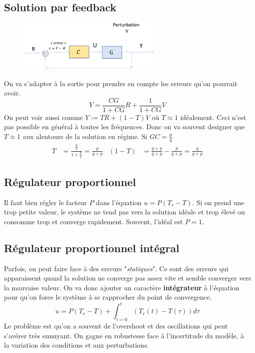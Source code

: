 \documentclass{report}
\begin{document}
\subsection{Solution par feedback}
\begin{figure}[H]
\centering
\includegraphics[width=7cm]{img/feedbeck.png}
\end{figure}
On va s'adapter à la sortie pour prendre en compte les erreurs qu'on pourrait avoir.
\begin{equation}
Y = \frac{CG}{1 + CG} R + \frac{1}{1 + CG}V
\end{equation}
On peut voir aussi comme $Y := TR + (1-T) V$ où $T \approx 1$ idéalement. Ceci n'est pas possible en général à toutes les fréquences. Donc on va souvent designer que $T \approx 1$ aux alentours de la solution en régime. Si $GC = \frac{p}{q}$
\begin{align*}
T &= \frac{\frac{p}{q}}{1+ \frac{p}{q}} = \frac{p}{q + p} & (1-T) &= \frac{q + p}{q + p} - \frac{p}{q + p} = \frac{q}{q + p}
\end{align*}

\subsection{Régulateur proportionnel}
Il faut bien régler le facteur $P$ dans l'équation $u = P(T_r -T)$. Si on prend une trop petite valeur, le système ne tend pas vers la solution idéale et trop élevé on consomme trop et converge rapidement. Souvent, l'idéal est $P = 1$.

\subsection{Régulateur proportionnel intégral}
Parfois, on peut faire face à des erreurs "\textit{statiques}". Ce sont des erreurs qui apparaissent quand la solution ne converge pas assez vite et semble converger vers la mauvaise valeur. On va donc ajouter un caractère \textbf{intégrateur} à l'équation pour qu'on force le système à se rapprocher du point de convergence.
\begin{equation}
u = P(T_r - T) + \int_{\tau  = 0}^{t} (T_r (t) - T(\tau)) d\tau
\end{equation}
Le problème est qu'on a souvent de l'overshoot et des oscillations qui peut s'avérer très ennuyant. On gagne en robustesse face à l'incertitude du modèle, à la variation des conditions et aux perturbations.
\end{document}

